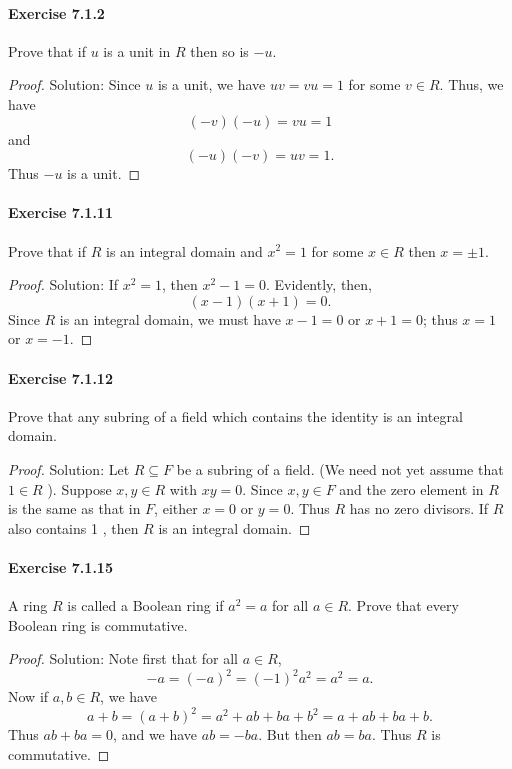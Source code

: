 \documentclass{article}
\theoremstyle{definition}
\begin{document}
\paragraph{Exercise 7.1.2} Prove that if $u$ is a unit in $R$ then so is $-u$.
\begin{proof}
    Solution: Since $u$ is a unit, we have $u v=v u=1$ for some $v \in R$. Thus, we have
$$
(-v)(-u)=v u=1
$$
and
$$
(-u)(-v)=u v=1 .
$$
Thus $-u$ is a unit.
\end{proof}



\paragraph{Exercise 7.1.11} Prove that if $R$ is an integral domain and $x^{2}=1$ for some $x \in R$ then $x=\pm 1$.
\begin{proof}
    Solution: If $x^2=1$, then $x^2-1=0$. Evidently, then,
$$
(x-1)(x+1)=0 .
$$
Since $R$ is an integral domain, we must have $x-1=0$ or $x+1=0$; thus $x=1$ or $x=-1$.
\end{proof}



\paragraph{Exercise 7.1.12} Prove that any subring of a field which contains the identity is an integral domain.
\begin{proof}
    Solution: Let $R \subseteq F$ be a subring of a field. (We need not yet assume that $1 \in R$ ). Suppose $x, y \in R$ with $x y=0$. Since $x, y \in F$ and the zero element in $R$ is the same as that in $F$, either $x=0$ or $y=0$. Thus $R$ has no zero divisors. If $R$ also contains 1 , then $R$ is an integral domain.
\end{proof}



\paragraph{Exercise 7.1.15} A ring $R$ is called a Boolean ring if $a^{2}=a$ for all $a \in R$. Prove that every Boolean ring is commutative.
\begin{proof}
    Solution: Note first that for all $a \in R$,
$$
-a=(-a)^2=(-1)^2 a^2=a^2=a .
$$
Now if $a, b \in R$, we have
$$
a+b=(a+b)^2=a^2+a b+b a+b^2=a+a b+b a+b .
$$
Thus $a b+b a=0$, and we have $a b=-b a$. But then $a b=b a$. Thus $R$ is commutative.
\end{proof}
\end{document}
